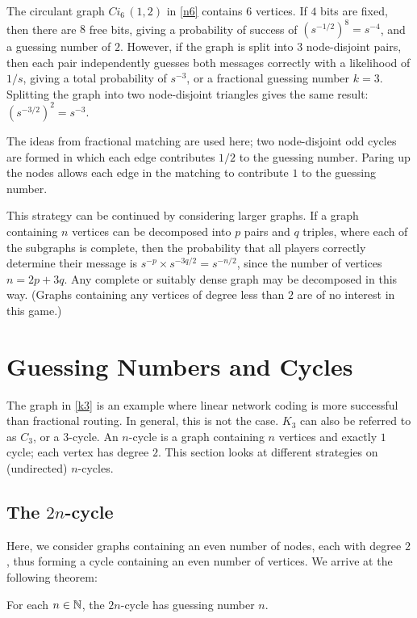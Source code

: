 The circulant graph $Ci_6 \, (1, 2)$ in \autoref{n6} contains $6$ vertices. If $4$ bits are fixed, then there are $8$ free bits, giving a probability of success of $(s^{-1/2})^8 = s^{-4}$, and a guessing number of $2$. However, if the graph is split into $3$ node-disjoint pairs, then each pair independently guesses both messages correctly with a likelihood of $1/s$, giving a total probability of $s^{-3}$, or a fractional guessing number $k = 3$. Splitting the graph into two node-disjoint triangles gives the same result: $(s^{-3/2})^2 = s^{-3}$.

The ideas from fractional matching are used here; two node-disjoint odd cycles are formed in which each edge contributes $1/2$ to the guessing number. Paring up the nodes allows each edge in the matching to contribute $1$ to the guessing number.

This strategy can be continued by considering larger graphs. If a graph containing $n$ vertices can be decomposed into $p$ pairs and $q$ triples, where each of the subgraphs is complete, then the probability that all players correctly determine their message is $s^{-p} \times s^{-3q/2} = s^{-n/2}$, since the number of vertices $n = 2p + 3q$. Any complete or suitably dense graph may be decomposed in this way. (Graphs containing any vertices of degree less than $2$ are of no interest in this game.)

\section{Guessing Numbers and Cycles}

The graph in \autoref{k3} is an example where linear network coding is more successful than fractional routing. In general, this is not the case. $K_3$ can also be referred to as $C_3$, or a $3$-cycle. An $n$-cycle is a graph containing $n$ vertices and exactly $1$ cycle; each vertex has degree $2$. This section looks at different strategies on (undirected) $n$-cycles.

\subsection{The $2n$-cycle}

Here, we consider graphs containing an even number of nodes, each with degree $2$, thus forming a cycle containing an even number of vertices. We arrive at the following theorem:

\begin{theorem}
 For each $n \in \mathbb{N}$, the $2n$-cycle has guessing number $n$.
\end{theorem}

